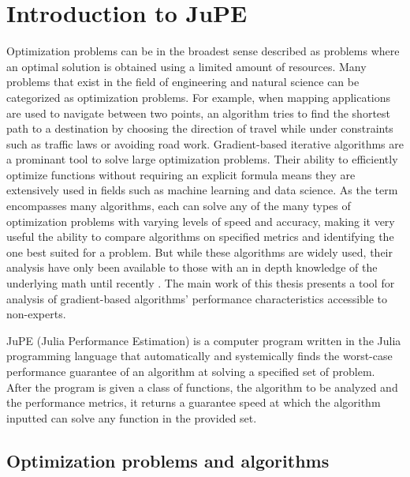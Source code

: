 \chapter{Introduction to JuPE}

Optimization problems can be in the broadest sense described as problems where an optimal solution is obtained using a limited amount of resources. Many problems that exist in the field of engineering and natural science can be categorized as optimization problems. For example, when mapping applications are used to navigate between two points, an algorithm tries to find the shortest path to a destination by choosing the direction of travel while under constraints such as traffic laws or avoiding road work.
Gradient-based iterative algorithms are a prominant tool to solve large optimization problems. Their ability to efficiently optimize functions without requiring an explicit formula means they are extensively used in fields such as machine learning and data science. As the term encompasses many algorithms, each can solve any of the many types of optimization problems with varying levels of speed and accuracy, making it very useful the ability to compare algorithms on specified metrics and identifying the one best suited for a problem. But while these algorithms are widely used, their analysis have only been available to those with an in depth knowledge of the underlying math until recently \cite{pepit}. The main work of this thesis presents a tool for analysis of gradient-based algorithms' performance characteristics accessible to non-experts.

JuPE (Julia Performance Estimation) is a computer program written in the Julia programming language that automatically and systemically finds the worst-case performance guarantee of an algorithm at solving a specified set of problem. After the program is given a class of functions, the algorithm to be analyzed and the performance metrics, it returns a guarantee speed at which the algorithm inputted can solve any function in the provided set.


\section{Optimization problems and algorithms}

